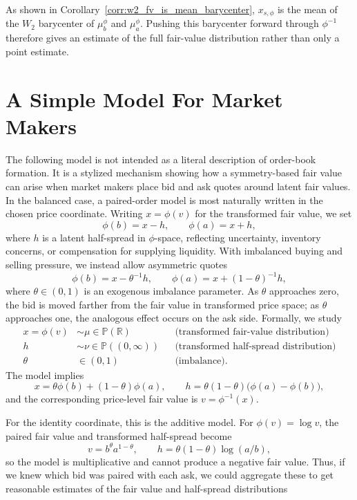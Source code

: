 %
\begin{remark}
    As shown in Corollary~\ref{corr:w2_fv_is_mean_barycenter}, $x_{s,\phi}$ is the mean of the $W_2$ barycenter of $\mu_b^\phi$ and $\mu_a^\phi$. Pushing this barycenter forward through $\phi^{-1}$ therefore gives an estimate of the full fair-value distribution rather than only a point estimate.
\end{remark}


\section{A Simple Model For Market Makers}

The following model is not intended as a literal description of order-book
formation. It is a stylized mechanism showing how a symmetry-based fair value
can arise when market makers place bid and ask quotes around latent fair values.
In the balanced case, a paired-order model is most naturally written in the
chosen price coordinate. Writing $x=\phi(v)$ for the transformed fair value, we set
%
\[\phi(b)=x-h, \qquad \phi(a)=x+h,\]
%
where $h$ is a latent half-spread in $\phi$-space, reflecting uncertainty,
inventory concerns, or compensation for supplying liquidity. With imbalanced
buying and selling pressure, we instead allow asymmetric quotes
%
\[\phi(b)=x-\theta^{-1}h, \qquad
  \phi(a)=x+(1-\theta)^{-1}h,\]
%
where $\theta\in(0,1)$ is an exogenous imbalance parameter. As $\theta$
approaches zero, the bid is moved farther from the fair value in transformed
price space; as $\theta$ approaches one, the analogous effect occurs on the ask
side. Formally, we study
%
\begin{align*}
    x=\phi(v) &\sim \mu \in \mathbb{P}(\mathbb{R})  && \text{(transformed fair-value distribution)} \\
    h &\sim \nu \in \mathbb{P}((0,\infty)) && \text{(transformed half-spread distribution)} \\
    \theta &\in (0,1) && \text{(imbalance)}.
\end{align*}
%
\noindent The model implies
%
\[x=\theta\phi(b)+(1-\theta)\phi(a), \qquad
  h=\theta(1-\theta)\bigl(\phi(a)-\phi(b)\bigr),\]
%
\noindent and the corresponding price-level fair value is $v=\phi^{-1}(x)$.

For the identity coordinate, this is the additive model. For $\phi(v)=\log v$,
the paired fair value and transformed half-spread become
%
\[v=b^\theta a^{1-\theta}, \qquad
h=\theta(1-\theta)\log(a/b),\]
%
\noindent so the model is multiplicative and cannot produce a negative fair value.
%
 Thus, if we knew which bid was paired with each ask, we could aggregate
 these to get reasonable estimates of the fair value and half-spread
 distributions

